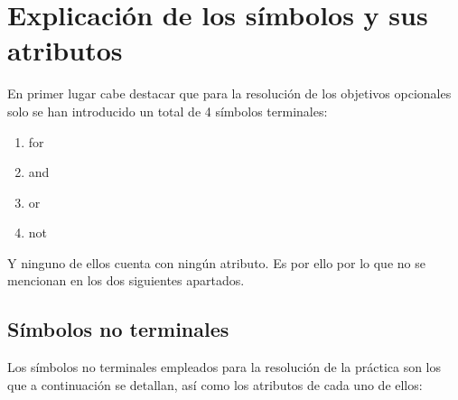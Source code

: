 \documentclass[12pt,a4paper,landscape]{article}
\theoremstyle{mytheor}
\begin{document}
\section{Explicación de los símbolos y sus atributos}
En primer lugar cabe destacar que para la resolución de los objetivos opcionales solo se han introducido un total de 4 símbolos terminales:
\begin{enumerate}
\item for
\item and
\item or
\item not
\end{enumerate}
Y ninguno de ellos cuenta con ningún atributo. Es por ello por lo que no se mencionan en los dos siguientes apartados.
\subsection{Símbolos no terminales}
Los símbolos no terminales empleados para la resolución de la práctica son los que a continuación se detallan, así como los atributos de cada uno de ellos:
\end{document}
